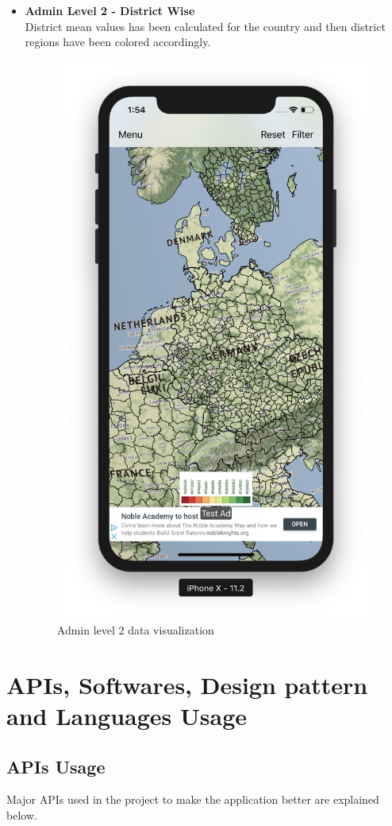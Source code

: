\begin{itemize}
    \item \textbf{Admin Level 2 - District Wise} \\
    District mean values has been calculated for the country and then district regions have been colored accordingly.
    
     \begin{figure}[H]
            \centering
            \includegraphics[width=0.25\linewidth]{figures/ch4/admin_level_2.png}
            \caption{\label{fig:admin_level_2_visual}  Admin level 2 data visualization}
        \end{figure}
    
\end{itemize}


\section{APIs, Softwares, Design pattern and Languages Usage}

\subsection{APIs Usage}

Major APIs used in the project to make the application better are explained below.

